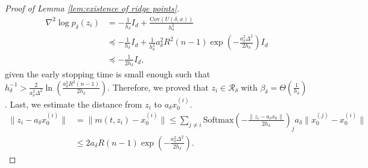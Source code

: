 \documentclass[11pt]{article}
\newcommand{\mc}{\mathcal}
\newcommand{\Softmax}{\mathrm{Softmax}}
\begin{document}
\begin{proof}[Proof of Lemma \ref{lem:existence of ridge points}]
\begin{align*}
    \nabla^2 \log p_\delta(z_i) &= -\frac{1}{h_\delta} I_d + \frac{\mathrm{Cov}(U(\delta,x))}{h_\delta^2} \\
    &\preceq -\frac{1}{h_\delta} I_d + \frac{1}{h_\delta^2} a_\delta^2 R^2 (n-1)\exp(-\frac{a_\delta^2\Delta^2}{2h_\delta}) I_d \\
    &\preceq -\frac{1}{2h_\delta }I_d,
\end{align*}
given the early stopping time is small enough such that $h_\delta^{-1}> \tfrac{2}{a_\delta^2 \Delta^2}\ln(\tfrac{a_\delta^2R^2(n-1)}{2h_\delta})$. Therefore, we proved that $z_i\in \mc{R}_\delta$ with $\beta_\delta = \Theta(\tfrac{1}{h_\delta}) $. Last, we estimate the distance from $z_i$ to $a_\delta x_0^{(i)}$.
\begin{align*}
    \| z_i-a_\delta x_0^{(i)} \| & = \| m(t,z_i)-x_0^{(i)} \|\le \sum_{j\neq i} \Softmax(-\frac{\|z_i-a_\delta x_0\|}{2h_\delta})_j a_\delta \| x_0^{(j)}-x_0^{(i)} \| \\
    &\le 2a_\delta R (n-1)\exp(-\frac{a_\delta^2\Delta^2}{2h_\delta}).
\end{align*}
\end{proof}
\end{document}
